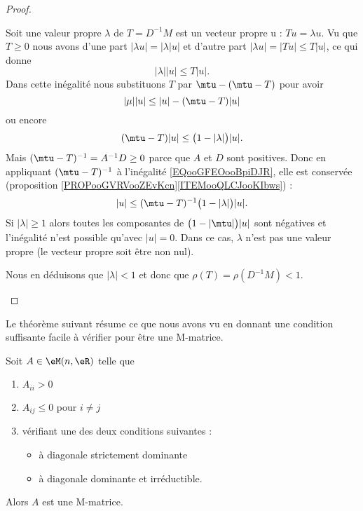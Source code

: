 \begin{proof}
\begin{subproof}
            Soit une valeur propre \( \lambda\) de \( T=D^{-1}M\) est un vecteur propre u : \( Tu=\lambda u\). Vu que \( T\geq 0\) nous avons d'une part \( | \lambda u |=| \lambda | u |\) et d'autre part \( | \lambda u |=| Tu |\leq T| u |\), ce qui donne
            \begin{equation}
                | \lambda | |u |\leq T| u |.
            \end{equation}
            Dans cette inégalité nous substituons \( T\) par \( \mtu-(\mtu-T)\) pour avoir
            \begin{equation}
                | \mu | |u |\leq | u |-(\mtu-T)| u |
            \end{equation}
            ou encore
            \begin{equation}        \label{EQooGFEOooBpiDJR}
                (\mtu-T)| u |\leq \big( 1-| \lambda | \big)| u |.
            \end{equation}
            Mais \( (\mtu-T)^{-1}=A^{-1}D\geq 0\) parce que \( A\) et \( D\) sont positives. Donc en appliquant \( (\mtu-T)^{-1}\) à l'inégalité \eqref{EQooGFEOooBpiDJR}, elle est conservée (proposition \ref{PROPooGVRVooZEvKcn}\ref{ITEMooQLCJooKIbws}) :
            \begin{equation}
                | u |\leq (\mtu-T)^{-1}\big( 1-| \lambda | \big)| u |.
            \end{equation}
            Si \( | \lambda |\geq 1\) alors toutes les composantes de \( \big( 1-| \mtu | \big)| u |\) sont négatives et l'inégalité n'est possible qu'avec \( | u |=0\). Dans ce cas, \( \lambda\) n'est pas une valeur propre (le vecteur propre soit être non nul).

            Nous en déduisons que \( | \lambda |<1\) et donc que \( \rho(T)=\rho(D^{-1}M)<1\).
    \end{subproof}
\end{proof}

Le théorème suivant résume ce que nous avons vu en donnant une condition suffisante facile à vérifier pour être une M-matrice.
\begin{theorem}     \label{THOooLZGSooSevggj}
    Soit \( A\in \eM(n,\eR)\) telle que
    \begin{enumerate}
        \item
            \( A_{ii}>0\) 
        \item
            \( A_{ij}\leq 0\) pour \( i\neq j\)
        \item
            vérifiant une des deux conditions suivantes :
    \begin{itemize}
        \item à diagonale strictement dominante
        \item à diagonale dominante et irréductible.
    \end{itemize}
    \end{enumerate}
    Alors \( A\) est une M-matrice.
\end{theorem}

